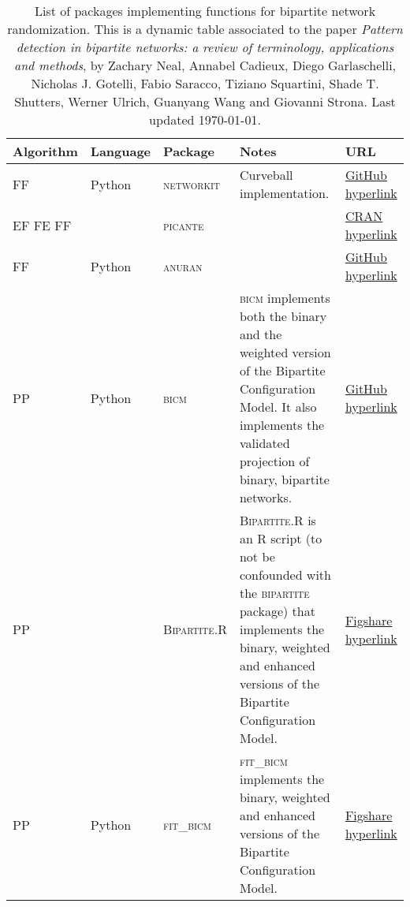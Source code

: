 \documentclass[]{article}
\begin{document}
\pagestyle{empty} 

\begin{table}[!htp]\centering
	\renewcommand{\arraystretch}{2}
	\caption*{List of packages implementing functions for bipartite network randomization. This is a dynamic table associated to the paper \textit{Pattern detection in bipartite networks: a review of terminology, applications and methods}, by Zachary Neal, Annabel Cadieux, Diego Garlaschelli, Nicholas J. Gotelli, Fabio Saracco, Tiziano Squartini, Shade T. Shutters, Werner Ulrich, Guanyang Wang and Giovanni Strona. Last updated \today.}\label{tab: }
	\scriptsize
	\begin{tabularx}{\columnwidth}{X|X|X|X|X}%
		\cellcolor[HTML]{A8A8A8}\textbf{Algorithm} &\cellcolor[HTML]{A8A8A8}\textbf{Language} &\cellcolor[HTML]{A8A8A8}\textbf{Package} &\cellcolor[HTML]{A8A8A8}\textbf{Notes} &\cellcolor[HTML]{A8A8A8}\textbf{URL} \\[2pt]\midrule\hline
		FF &\faPython Python &\textsc{networkit} &Curveball implementation. &\href{https://networkit.github.io/dev-docs/notebooks/Randomization.html}{GitHub hyperlink} \\[2pt] \hline
		EF FE FF &\faRProject &\textsc{picante} & &\href{https://rdrr.io/cran/picante/man/randomizeSample.html}{CRAN hyperlink} \\[2pt] \hline
		FF &\faPython Python &\textsc{anuran} & &\href{https://github.com/ramellose/anuran}{GitHub hyperlink} \\[2pt] \hline
		PP &\faPython Python &\textsc{bicm} &\textsc{bicm} implements both the binary and the weighted version of the Bipartite Configuration Model. It also implements the validated projection of binary, bipartite networks. &\href{https://github.com/mat701/BiCM}{GitHub hyperlink} \\[2pt] \hline
		PP &\faRProject  &\textsc{Bipartite.R} &\textsc{Bipartite.R} is an R script (to not be confounded with the \textsc{bipartite} package) that implements the binary, weighted and enhanced versions of the Bipartite Configuration Model.  &\href{https://figshare.com/articles/software/Fluctuating\_ecological\_networks\_a\_synthesis\_of\_maximum-entropy\_approaches\_for\_pattern\_detection\_and\_process\_inference\_-\_Computer\_codes\_and\_Data\_examples/20531655/1}{Figshare hyperlink} \\[2pt] \hline
		PP &\faPython Python &\textsc{fit\_bicm} &\textsc{fit\_bicm} implements the binary, weighted and enhanced versions of the Bipartite Configuration Model. &\href{https://figshare.com/articles/software/Fluctuating\_ecological\_networks\_a\_synthesis\_of\_maximum-entropy\_approaches\_for\_pattern\_detection\_and\_process\_inference\_-\_Computer\_codes\_and\_Data\_examples/20531655/1}{Figshare hyperlink} \\[2pt] \hline

\end{tabularx}
\end{table}
\end{document}

